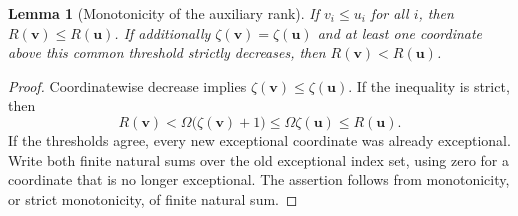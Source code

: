 \documentclass[11pt,letterpaper]{article}
\newtheorem{lemma}[theorem]{Lemma}
\theoremstyle{definition}
\theoremstyle{remark}
\newcommand{\bu}{\boldsymbol{u}}
\newcommand{\bv}{\boldsymbol{v}}
\begin{document}
\begin{lemma}[Monotonicity of the auxiliary rank]\label{lem:rank-monotone}
If $v_i\leq u_i$ for all $i$, then $R(\bv)\leq R(\bu)$.
If additionally $\zeta(\bv)=\zeta(\bu)$ and at least one coordinate above this
common threshold strictly decreases, then $R(\bv)<R(\bu)$.
\end{lemma}
\begin{proof}
Coordinatewise decrease implies $\zeta(\bv)\leq\zeta(\bu)$. If the inequality is
strict, then
\[
 R(\bv)<\Omega\bigl(\zeta(\bv)+1\bigr)
 \leq\Omega\zeta(\bu)\leq R(\bu).
\]
If the thresholds agree, every new exceptional coordinate was already
exceptional. Write both finite natural sums over the old exceptional index set,
using zero for a coordinate that is no longer exceptional. The assertion follows
from monotonicity, or strict monotonicity, of finite natural sum.
\end{proof}
\end{document}
